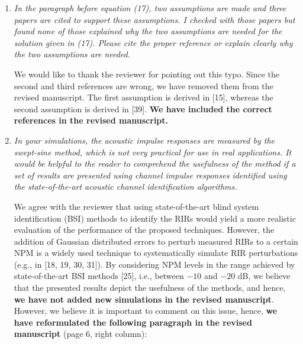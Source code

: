 \documentclass[9pt, a4paper]{article}
\begin{document}
\begin{enumerate}

  \item  {\it{In the paragraph before equation (17), two assumptions are made and three papers are cited to support these assumptions.  I checked with those papers but found none of those explained why the two assumptions are needed for the solution given in (17).  Please cite the proper reference or explain clearly why the two assumptions are needed.}}

We would like to thank the reviewer for pointing out this typo. 
Since the second and third references are wrong, we have removed them from the revised manuscript. 
The first assumption is derived in [15], whereas the second assumption is derived in [39].
{\textbf{We have included the correct references in the revised manuscript.}}

\item {\it{In your simulations, the acoustic impulse responses are measured by the swept-sine method, which is not very practical for use in real applications. It would be helpful to the reader to comprehend the usefulness of the method if a set of results are presented using channel impulse responses identified using the state-of-the-art acoustic channel identification algorithms.}}

We agree with the reviewer that using state-of-the-art blind system identification (BSI) methods to identify the RIRs would yield a more realistic evaluation of the performance of the proposed techniques.
However, the addition of Gaussian distributed errors to perturb measured RIRs to a certain NPM is a widely used technique to systematically simulate RIR perturbations (e.g., in [18, 19, 30, 31]).
By considering NPM levels in the range achieved by state-of-the-art BSI methods [25], i.e., between $-10$ and $-20$ dB, we believe that the presented results depict the usefulness of the methods, and hence, {\textbf{we have not added new simulations in the revised manuscript}}. 
However, we believe it is important to comment on this issue, hence, {\textbf{we have reformulated the following paragraph in the revised manuscript}} (page 6, right column):


\end{enumerate}
\end{document}
